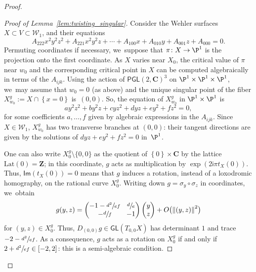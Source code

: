 \documentclass[JEP,XML,SOM,Unicode,published]{cedram}
\newcommand{\set}[1]{\left\{#1\right\}}
\newcommand{\norm}[1]{{\left\Vert#1\right\Vert}}
\newcommand{\blrpar}[1]{\bigl(#1\bigr)}
\def\C{\mathbf{C}}
\def\Z{\mathbf{Z}}
\newcommand{\cW}{\mathcal{W}}
\newcommand{\Lat}{{\mathrm{Lat}}}
\newcommand\ii{{\mathsf{i}}}
\newcommand{\Ima}{{\mathsf{Im}}}
\newcommand\PGL{{\mathsf{PGL}}}
\newcommand\GL{{\mathsf{GL}}}
\theoremstyle{plain}
\theoremstyle{definition}
\begin{document}
\begin{proof}
\begin{proof}[Proof of Lemma~\ref{lem:twisting_singular}]
Consider the Wehler surfaces $X\subset V\subset \cW_1$, and their equations
\begin{equation*}
A_{222} x^2y^2z^2+ A_{221}x^2y^2z+\cdots + A_{100}x + A_{010}y+A_{001}z + A_{000} = 0.
\end{equation*}
Permuting coordinates if necessary, we~suppose that $\pi\colon X\to \P^1$ is the projection onto the first coordinate.
As $X$ varies near $X_0$, the critical value of $\pi$ near $w_0$ and the corresponding critical point in $X$ can be computed algebraically in terms of the $A_{ijk}$. Using the action of $\PGL(2, \C)^3$ on $\P^1\times \P^1\times \P^1$, we~may
assume that $w_0=0$ (as above) and the unique singular point of the fiber $X_{w_0}^g:=X \cap \set{x= 0}$ is~$(0,0)$.
So, the equation of $X_{w_0}^g$ in $\P^1\times \P^1$ is
\begin{equation*}
ay^2z^2 + b y^2z+cy z^2+ dyz+ey^2+f z^2 = 0,
\end{equation*}
for some coefficients $a, \ldots , f$ given by algebraic expressions in the $A_{ijk}$.
Since $X\in \cW_1$, $X_{w_0}^g$ has two transverse branches at $(0,0)$: their tangent directions are given
by the solutions of $dyz+ey^2+f z^2 = 0$ in~$\P^1$.

One can also write $X_0^g\setminus\{0,0\}$ as the quotient of $\set{0}\times \C$ by the lattice $\Lat(0)=\Z$; in this coordinate,
$g$ acts as multiplication by $\exp(2\ii \pi t_X(0))$. Thus, $\Ima(t_X(0)) = 0$ means that $g$ induces a rotation, instead of a loxodromic homography, on the rational curve $X_0^g$. Writing down $g = \sigma_y\circ \sigma_z$ in coordinates, we~obtain
\begin{equation*}\arraycolsep4.5pt
g(y,z) = \begin{pmatrix}-1 - \sfrac{d^2}{ef}& \sfrac{d}{e} \\ -\sfrac{d}{f} & -1
\end{pmatrix}\begin{pmatrix} y\\z\end{pmatrix} + O\blrpar{\norm{(y,z)}^2}
\end{equation*}
for $(y,z)\in X_0^g$.
Thus, $D_{(0, 0)}g\in \GL(T_{0,0}X)$ has determinant $1$ and trace $ - 2- \sfrac{d^2}{ef}$.
As a consequence, $g$ acts as a rotation on $X_0^g$ if and only if $ 2 + \sfrac{d^2}{ef} \in[-2, 2]$: this is a semi-algebraic condition.
\end{proof}


\end{proof}
\end{document}
